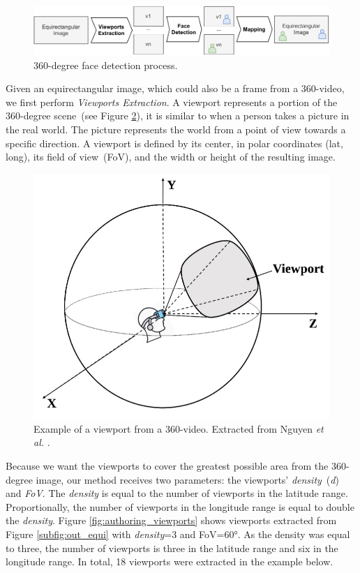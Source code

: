 \begin{figure}[!ht]
    \centering
    \includegraphics[width=1\linewidth]{img/video360/360facedetection.pdf}
    \caption{360-degree face detection process.}
    \label{fig:360_face_detection}
\end{figure}

Given an equirectangular image, which could also be a frame from a 360-video, we first perform \emph{Viewports Extraction}. A viewport represents a portion of the 360-degree scene~(see Figure \ref{fig:authoring_exviewport}), it is similar to when a person takes a picture in the real world. The picture represents the world from a point of view towards a specific direction. A viewport is defined by its center, in polar coordinates (lat, long), its field of view~(FoV), and the width or height of the resulting image.

\begin{figure}[!ht]
    \centering
    \includegraphics[width=0.5\linewidth]{img/video360/viewport.jpg}
    \caption{Example of a viewport from a 360-video. Extracted from Nguyen \emph{et al.} \cite{nguyen2020evaluation}.}
    \label{fig:authoring_exviewport}
\end{figure}

Because we want the viewports to cover the greatest possible area from the 360-degree image, our method receives two parameters: the viewports' \emph{density}~(\emph{d}) and \emph{FoV}. The \emph{density} is equal to the number of viewports in the latitude range. Proportionally, the number of viewports in the longitude range is equal to double the \emph{density}. Figure \ref{fig:authoring_viewports} shows viewports extracted from Figure \ref{subfig:out_equi} with \emph{density}=3 and FoV=60°. As the density was equal to three, the number of viewports is three in the latitude range and six in the longitude range. In total, 18 viewports were extracted in the example below.

